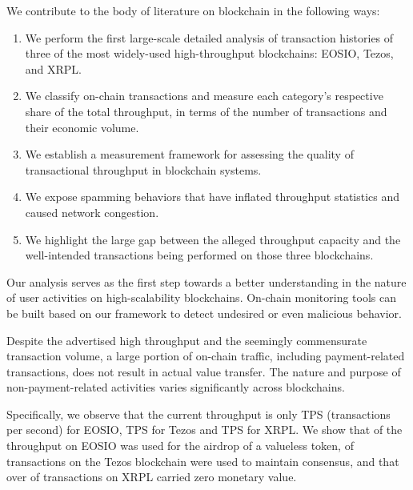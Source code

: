 We contribute to the body of literature on blockchain in the following ways:  
\begin{enumerate}%
\item We perform the first large-scale detailed analysis of transaction histories of three of the most widely-used high-throughput blockchains: EOSIO, Tezos, and XRPL.

\item We classify on-chain transactions and measure each category's respective share of the total throughput, in terms of the number of transactions and their economic volume.

\item We establish a measurement framework for assessing the quality of transactional throughput in blockchain systems.

\item We expose spamming behaviors that have inflated throughput statistics and caused network congestion.

\item We highlight the large gap between the alleged throughput capacity and the well-intended transactions being performed on those three blockchains.
\end{enumerate}
%
Our analysis serves as the first step towards a better understanding in the nature of user activities on high-scalability blockchains. On-chain monitoring tools can be built based on our framework to detect undesired or even malicious behavior.

Despite the advertised high throughput and the seemingly commensurate transaction volume, a large portion of on-chain traffic, including payment-related transactions, does not result in actual value transfer. 
The nature and purpose of non-payment-related activities varies significantly across blockchains.

Specifically, we observe that the current throughput is only TPS (transactions per second) for EOSIO,  TPS for Tezos and  TPS for XRPL.
We show that  of the throughput on EOSIO was used for the airdrop of a valueless token,  of transactions on the Tezos blockchain were used to maintain consensus,
and that over  of transactions on XRPL carried zero monetary value.
